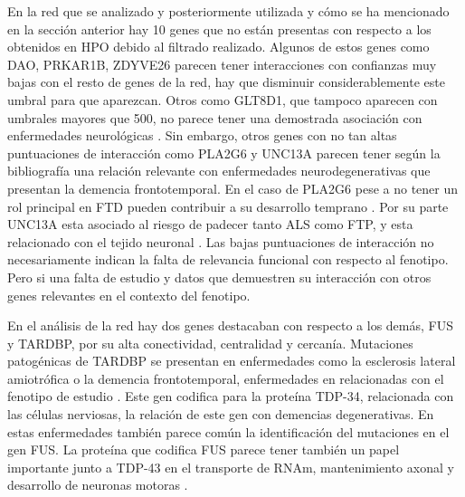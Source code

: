 En la red que se analizado y posteriormente utilizada y cómo se ha mencionado en la sección anterior hay 10 genes que no están presentas con respecto a los obtenidos en HPO debido al filtrado realizado.
Algunos de estos genes como DAO, PRKAR1B, ZDYVE26 parecen tener interacciones con confianzas muy bajas con el resto de genes de la red, hay que disminuir considerablemente este umbral para que aparezcan. 
Otros como GLT8D1, que tampoco aparecen con umbrales mayores que 500, no parece tener una demostrada asociación con enfermedades neurológicas \cite{Yilihamu2021}.
Sin embargo, otros genes con no tan altas puntuaciones de interacción como PLA2G6 y UNC13A parecen tener según la bibliografía una relación relevante con enfermedades neurodegenerativas que presentan la demencia frontotemporal. En el caso de PLA2G6  pese a no tener un rol principal en FTD pueden contribuir a su desarrollo temprano \cite{Tomiyama2011}. 
Por su parte UNC13A esta asociado al riesgo de padecer tanto ALS como FTP, y esta relacionado con el tejido neuronal \cite{Diekstra2012}.
Las bajas puntuaciones de interacción no necesariamente indican la falta de relevancia funcional con respecto al fenotipo. Pero si una falta de estudio y datos que demuestren su interacción con otros genes relevantes en el contexto del fenotipo.


En el análisis de la red hay dos genes destacaban con respecto a los demás, FUS y TARDBP, por su alta conectividad, centralidad y cercanía.
 Mutaciones patogénicas de TARDBP se presentan en enfermedades como la esclerosis lateral amiotrófica o la demencia frontotemporal, enfermedades en relacionadas con el fenotipo de estudio \cite{Monohar2009}.
 Este gen codifica para la proteína TDP-34, relacionada con las células nerviosas, la relación de este gen con demencias degenerativas.\cite{Ure2021}
 En estas enfermedades también parece común la identificación del mutaciones en el gen FUS.
La proteína que codifica FUS parece tener también un papel importante junto a TDP-43 en el transporte de RNAm, mantenimiento axonal y desarrollo de neuronas motoras  \cite{Lattante2013}.






